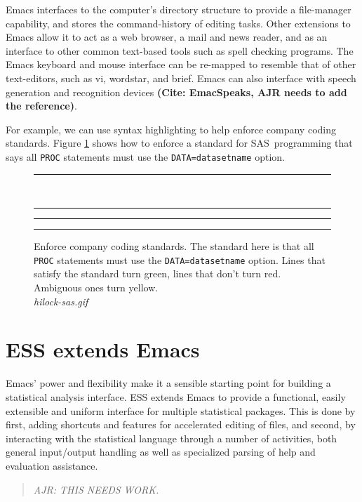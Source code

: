 \documentclass{article}
\newcommand*{\SAS}{\textsc{SAS}}
\newcommand{\stexttt}[1]{{\small\texttt{#1}}}
\newcommand{\emptyfig}{
\hspace*{42pt}\rule{324pt}{.25pt}\\
\hspace*{42pt}\rule{.25pt}{10pc}
\rule{316pt}{.25pt}
\rule{.25pt}{10pc}}
\newenvironment{Comment}{\begin{quote}\small\itshape }{\end{quote}}
\begin{document}
Emacs interfaces to the computer's directory structure to provide a
file-manager capability, and stores the command-history of editing
tasks.  Other extensions to Emacs allow it to act as a web browser, a
mail and news reader, and as an interface to other common text-based
tools such as spell checking programs.  The Emacs keyboard and mouse
interface can be re-mapped to resemble that of other text-editors,
such as vi, wordstar, and brief.  Emacs can also interface with speech
generation and recognition devices \textbf{(Cite: EmacSpeaks, AJR
  needs to add the reference)}.

For example, we can use syntax highlighting to help enforce company
coding standards.  Figure \ref{f.hilock} shows how to enforce a
standard for \SAS\ programming that says all \stexttt{PROC} statements
must use the \stexttt{DATA=datasetname} option.

\begin{figure}
\emptyfig
\caption[place holder for a long caption]{Enforce company coding
standards.  The standard here is that all \stexttt{PROC} statements must use
the \stexttt{DATA=datasetname} option.  Lines that satisfy the standard
turn green, lines that don't turn red.  Ambiguous ones turn yellow.\\
{\it hilock-sas.gif}
\label{f.hilock}}
\end{figure}


\section{ESS extends Emacs}
\label{sec:ess-extends-emacs}

Emacs' power and flexibility make it a sensible starting point for
building a statistical analysis interface.  ESS extends Emacs to
provide a functional, easily extensible and uniform interface for
multiple statistical packages.  This is done by first, adding
shortcuts and features for accelerated editing of files, and second,
by interacting with the statistical language through a number of
activities, both general input/output handling as well as specialized
parsing of help and evaluation assistance.

\begin{Comment}
AJR: THIS NEEDS WORK.
\end{Comment}

\end{document}
